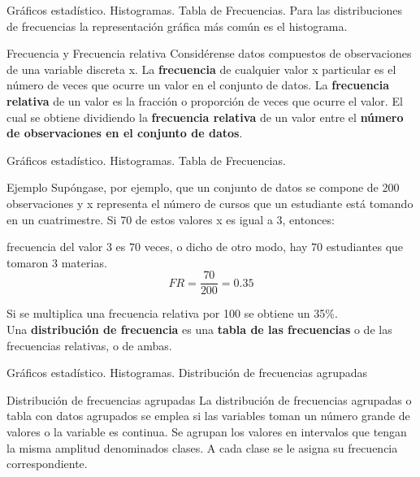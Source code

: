 \documentclass[11pt]{beamer}
\begin{document}
      \begin{frame}{Gráficos estadístico. Histogramas. Tabla de Frecuencias.}
          Para las distribuciones de frecuencias la representación gráfica más común es el histograma.
          \begin{block}{Frecuencia y Frecuencia relativa}
              Considérense datos compuestos de observaciones de una variable discreta x. La\textbf{ frecuencia} de cualquier valor x particular es el número de veces que ocurre un valor en el conjunto de datos. La \textbf{frecuencia relativa} de un valor es la fracción o proporción de veces que
ocurre el valor. El cual se obtiene dividiendo la \textbf{frecuencia relativa} de un valor entre el \textbf{número de observaciones en el conjunto de datos}.

          \end{block}
      \end{frame}

      \begin{frame}{Gráficos estadístico. Histogramas. Tabla de Frecuencias.}

        \begin{block}{Ejemplo}
          Supóngase, por ejemplo, que un conjunto de datos se compone de 200 observaciones y x representa el número de cursos que un estudiante está tomando en un cuatrimestre. Si 70 de estos valores x es igual a 3, entonces:

          \pause
          frecuencia del valor 3 es 70 veces, o dicho de otro modo, hay 70 estudiantes que tomaron 3 materias.
          \pause
          $$FR =\dfrac{70}{200}= 0.35$$

          Si se multiplica una frecuencia relativa por 100 se obtiene un 35\%.\\
          \pause
          Una \textbf{distribución de frecuencia} es una \textbf{tabla de las frecuencias} o de las frecuencias relativas, o de ambas.
       \end{block}
      \end{frame}

      \begin{frame}{Gráficos estadístico. Histogramas. Distribución de frecuencias agrupadas}
          \begin{block}{Distribución de frecuencias agrupadas}
            La distribución de frecuencias agrupadas o tabla con datos agrupados se emplea si las variables toman un número grande de valores o la variable es continua. Se agrupan los valores en intervalos que tengan la misma amplitud denominados clases. A cada clase se le asigna su frecuencia correspondiente.
          \end{block}

      \end{frame}
\end{document}
